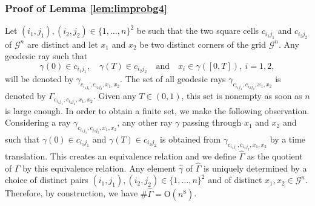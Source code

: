 \documentclass[10pt]{amsart}
\theoremstyle{definition}
\begin{document}
\subsubsection{Proof of Lemma \ref{lem:limprobg4}}
Let $(i_1,j_1), (i_2,j_2)\in \{1,\ldots,n\}^2$ be such that the two square cells $c_{i_1j_1}$ and $c_{i_2j_2}$ of $\mathcal{G}^n$ are distinct and let $x_1$ and $x_2$ be two distinct corners of the grid $\mathcal{G}^n$. Any geodesic ray such that
\[
\gamma(0)\in c_{i_1j_1}, \quad \gamma(T)\in c_{i_2j_2}\quad \text{and}\quad x_i\in \gamma([0,T]), \ i=1,2,
\]
will be denoted by $\gamma_{c_{i_1j_1},c_{i_2j_2},x_1,x_2}$.
{The set of all geodesic rays $\gamma_{c_{i_1j_1},c_{i_2j_2},x_1,x_2}$ is denoted by $\Gamma_{c_{i_1j_1},c_{i_2j_2},x_1,x_2}$. Given any $T\in(0,1)$, this set is nonempty as soon as $n$ is large enough.
In order to obtain a finite set, we make the following observation. Considering a ray $\gamma_{c_{i_1j_1},c_{i_2j_2},x_1,x_2}$, any other ray $\gamma$ passing through $x_1$ and $x_2$ and such that $\gamma(0)\in c_{i_1j_1}$ and $\gamma(T)\in c_{i_2j_2}$ is obtained from $\gamma_{c_{i_1j_1},c_{i_2j_2},x_1,x_2}$ by a time translation. This creates an equivalence relation and we define $\hat \Gamma$ as the quotient of $\Gamma$ by this equivalence relation. Any element $\hat\gamma$ of $\hat\Gamma$ is uniquely determined by a choice of distinct pairs $(i_1,j_1), (i_2,j_2)\in \{1,\ldots,n\}^2$ and of distinct $x_1,x_2\in \mathcal{G}^n$.
}
Therefore, by construction, we have $\#\hat\Gamma=\mathrm{O}(n^8)$.
\end{document}
